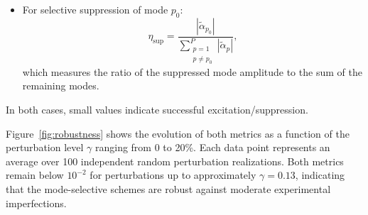 \documentclass[%
 reprint,
 amsmath,amssymb,
 aps,
 prb,
]{revtex4-2}
\begin{document}
\begin{appendix}
{\begin{itemize}
    \item For selective suppression of mode $p_0$:
    \begin{equation}
    \eta_{\text{sup}} = \frac{|\tilde{\alpha}_{p_0}|}{\sum_{\substack{p=1\\p \neq p_0}}^P |\tilde{\alpha}_p|},
    \end{equation}
    which measures the ratio of the suppressed mode amplitude to the sum of the remaining modes.
    \end{itemize}
    In both cases, small values indicate successful excitation/suppression.


    Figure~\ref{fig:robustness} shows the evolution of both metrics as a function of the perturbation level $\gamma$ ranging from 0 to 20\%. Each data point represents an average over 100 independent random perturbation realizations. Both metrics remain below $10^{-2}$ for perturbations up to approximately $\gamma = 0.13$, indicating that the mode-selective schemes are robust against moderate experimental imperfections.
}

\end{appendix}


\end{document}
